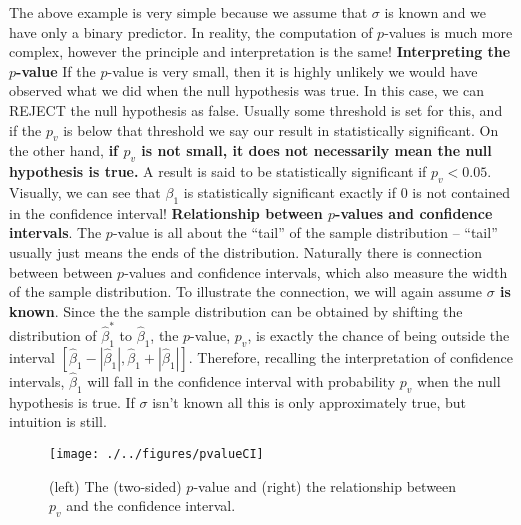  The above example is very simple because we assume that $\sigma$ is known and we have only a binary predictor. In reality, the computation of $p$-values is much more complex, however the principle and interpretation is the same!
 {\bf Interpreting the $p$-value} If the $p$-value is very small, then it is highly unlikely we would have observed what we did when the null hypothesis was true. In this case, we can REJECT the null hypothesis as false. Usually some threshold is set for this, and if the $p_v$ is below that threshold we say our result in statistically significant. On the other hand, {\bf if $p_v$ is not small, it does not necessarily mean the null hypothesis is true.} A result is said to be statistically significant if $p_v<0.05$. Visually, we can see that $\beta_1$ is statistically significant exactly if $0$ is not contained in the confidence interval! 
{\bf Relationship between $p$-values and confidence intervals}.  The $p$-value is all about the ``tail'' of the sample distribution -- ``tail'' usually just means the ends of the distribution. Naturally there is connection between between $p$-values and confidence intervals, which also measure the width of the sample distribution. To illustrate the connection, we will again assume {\bf $\sigma$ is known}.  Since the  the sample distribution can be obtained by shifting the distribution of $\hat{\beta}_1^*$ to $\hat{\beta}_1$, the $p$-value, $p_v$, is exactly the chance of being outside the interval $[\hat{\beta}_1 - |\hat{\beta}_1|,\hat{\beta}_1 + |\hat{\beta}_1|]$. Therefore,  recalling the interpretation of confidence intervals, $\hat{\beta}_1$ will fall in the confidence interval with probability $p_v$ when the null hypothesis is true.  If $\sigma$ isn't known all this is only approximately true, but intuition is still. 



\begin{figure}[h]
\centering
\texttt{[image: ./../figures/pvalueCI]}
\caption{(left) The (two-sided) $p$-value and (right) the relationship between $p_v$ and the confidence interval. }\label{fig:pvalue}
\end{figure}




\newpage

